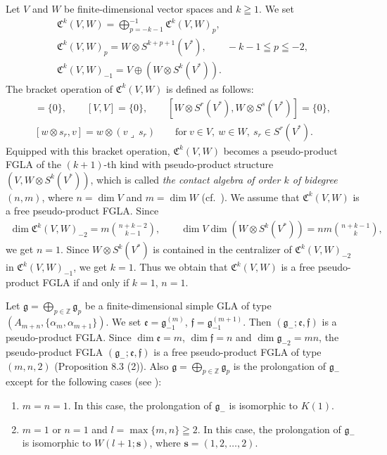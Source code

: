 \documentclass[11pt]{article}
\numberwithin{equation}{section}
\numberwithin{theorem}{section}
\numberwithin{proposition}{section}
\numberwithin{lemma}{section}
\numberwithin{corollary}{section}
\numberwithin{definition}{section}
\numberwithin{example}{section}
\numberwithin{remark}{section}
\numberwithin{note}{section}
\newcommand{\gla}[1]{\mathfrak#1=\bigoplus\limits_{p\in\mathbb Z}\mathfrak#1_p} \renewcommand{\labelenumi}{{\rm (\arabic{enumi})}}
\begin{document}
\begin{example}
Let $V$ and $W$ be f\/inite-dimensional vector spaces and $k\geqq1$.
We set
\begin{gather*}
\mathfrak C^{k}(V,W) =\bigoplus\limits_{p=-k-1}^{-1}\mathfrak C^{k}(V,W)_p, \\
\mathfrak C^{k}(V,W)_p=W\otimes S^{k+p+1}(V^*), \qquad
 -k-1\leqq p\leqq -2, \\
\mathfrak C^{k}(V,W)_{-1} =V\oplus (W\otimes S^{k}(V^*)).
\end{gather*}
The bracket operation of $\mathfrak C^{k}(V,W)$ is def\/ined as follows:
\begin{gather*}
  [W,V]=\{0\},\qquad [V,V]=\{0\}, \qquad [W\otimes S^{r}(V^*),W\otimes S^{s}(V^*)]=\{0\}, \\
[w\otimes s_r,v]=w\otimes (v\lrcorner\,s_r)\qquad \text{for}\  v\in V,\ w\in W,
\ s_r\in S^r(V^*).
\end{gather*}
Equipped with this bracket operation, $\mathfrak C^{k}(V,W)$ becomes
a pseudo-product FGLA of the $(k+1)$-th kind
with pseudo-product structure $(V,W\otimes S^{k}(V^*))$,
which is called
{\it the contact algebra of order $k$ of bidegree} $(n,m)$, where
$n=\dim V$ and $m=\dim W$ (cf.~\cite[p.~133]{yam82:1}).
We assume that $\mathfrak C^{k}(V,W)$ is a free pseudo-product FGLA.
Since
\begin{gather*}
\dim \mathfrak C^{k}(V,W)_{-2}=m\binom{n+k-2}{k-1}, \qquad
\dim V\dim (W\otimes S^{k}(V^*))= nm\binom{n+k-1}{k},
\end{gather*}
we get $n=1$.
Since $W\otimes S^{k}(V^*)$ is contained in the centralizer of
$\mathfrak C^{k}(V,W)_{-2}$
in $\mathfrak C^{k}(V,W)_{-1}$, we get $k=1$.
Thus we obtain that $\mathfrak C^{k}(V,W)$ is a free pseudo-product FGLA
if and only if $k=1$, $n=1$.
\end{example}

\begin{example}\label{ex8.2}
Let $\gla g$ be a f\/inite-dimensional simple GLA of type
$(A_{m+n},\{\alpha_m,\alpha_{m+1}\})$.
We set $\mathfrak e=\mathfrak g_{-1}^{(m)}$, $\mathfrak f=\mathfrak g_{-1}^{(m+1)}$. Then $(\mathfrak g_-;\mathfrak e,\mathfrak f)$
is a pseudo-product FGLA.
Since $\dim \mathfrak e=m$, $\dim\mathfrak f=n$ and
$\dim\mathfrak g_{-2}=mn$, the pseudo-product FGLA
$(\mathfrak g_-;\mathfrak e,\mathfrak f)$ is a free pseudo-product FGLA
of type $(m,n,2)$ (Proposition 8.3 (2)). Also
$\gla g$ is the prolongation of $\mathfrak g_-$ except for the following
cases (see \cite{yam93:1}):
\begin{enumerate}\itemsep=0pt
\item $m=n=1$. In this case,
the prolongation of $\mathfrak g_-$ is isomorphic to $K(1)$.
\item $m=1$ or $n=1$ and $l=\max\{m,n\}\geqq2$. In this case,
the prolongation of $\mathfrak g_-$ is isomorphic to $W(l+1;\bm s)$,
where $\bm s=(1,2,\dots,2)$.
\end{enumerate}
\end{example}
\end{document}
